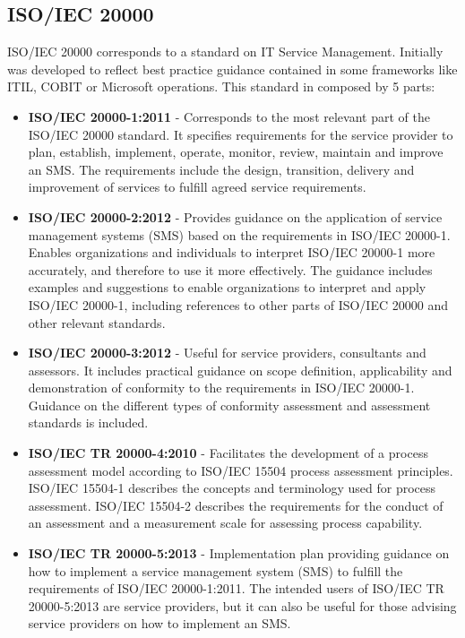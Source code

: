 \subsection{ISO/IEC 20000}

ISO/IEC 20000 corresponds to a standard on IT Service Management. Initially was developed to reflect best practice guidance contained in some frameworks like ITIL, COBIT or Microsoft operations. This standard in composed by 5 parts:

\begin{itemize}
  \item \textbf{ISO/IEC 20000-1:2011} -  Corresponds to the most relevant part of the ISO/IEC 20000 standard. It specifies requirements for the service provider to plan, establish, implement, operate, monitor, review, maintain and improve an SMS. The requirements include the design, transition, delivery and improvement of services to fulfill agreed service requirements.\par
  \vspace{5mm}
  \item \textbf{ISO/IEC 20000-2:2012} - Provides guidance on the application of service management systems (SMS) based on the requirements in ISO/IEC 20000-1. Enables organizations and individuals to interpret ISO/IEC 20000-1 more accurately, and therefore to use it more effectively. The guidance includes examples and suggestions to enable organizations to interpret and apply ISO/IEC 20000-1, including references to other parts of ISO/IEC 20000 and other relevant standards.\par
  \vspace{5mm}
  \item \textbf{ISO/IEC 20000-3:2012} - Useful for service providers, consultants and assessors. It includes practical guidance on scope definition, applicability and demonstration of conformity to the requirements in ISO/IEC 20000-1. Guidance on the different types of conformity assessment and assessment standards is included.\par
  \vspace{5mm}
  \item \textbf{ISO/IEC TR 20000-4:2010} - Facilitates the development of a process assessment model according to ISO/IEC 15504 process assessment principles. ISO/IEC 15504-1 describes the concepts and terminology used for process assessment. ISO/IEC 15504-2 describes the requirements for the conduct of an assessment and a measurement scale for assessing process capability.\par
  \vspace{5mm}
  \item \textbf{ISO/IEC TR 20000-5:2013} - Implementation plan providing guidance on how to implement a service management system (SMS) to fulfill the requirements of ISO/IEC 20000-1:2011. The intended users of ISO/IEC TR 20000-5:2013 are service providers, but it can also be useful for those advising service providers on how to implement an SMS.\par
  \vspace{5mm}


\end{itemize}
